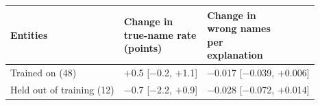 \begin{tabular}{@{}lll@{}}
\toprule
Entities & \shortstack[l]{Change in\\true-name rate\\(points)} & \shortstack[l]{Change in\\wrong names\\per\\explanation} \\
\midrule
Trained on (48) & $+$0.5 {\scriptsize[$-$0.2, $+$1.1]} & $-$0.017 {\scriptsize[$-$0.039, $+$0.006]} \\
Held out of training (12) & $-$0.7 {\scriptsize[$-$2.2, $+$0.9]} & $-$0.028 {\scriptsize[$-$0.072, $+$0.014]} \\
\bottomrule
\end{tabular}
